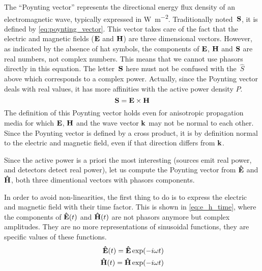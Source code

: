 The ``Poynting vector'' represents the directional energy flux density of an electromagnetic wave, typically expressed in \si{\watt\per\meter\squared}.
Traditionally noted~$\mathbf{S}$, it is defined by \cref{eq:poynting_vector}.
This vector takes care of the fact that the electric and magnetic fields ($\mathbf{E}$ and $\mathbf{H}$) are three dimensional vectors.
However, as indicated by the absence of hat symbols, the components of $\mathbf{E}$, $\mathbf{H}$ and $\mathbf{S}$ are real numbers, not complex numbers.
This means that we cannot use phasors directly in this equation.
The letter~$\mathbf{S}$ here must not be confused with the~$\hat{S}$ above which corresponds to a complex power.
Actually, since the Poynting vector deals with real values, it has more affinities with the active power density $P$.
\begin{equation}
    \mathbf{S} = \mathbf{E} \times \mathbf{H} \label{eq:poynting_vector}
\end{equation}
The definition of this Poynting vector holds even for anisotropic propagation media for which $\mathbf{E}$, $\mathbf{H}$ and the wave vector $\mathbf{k}$ may not be normal to each other.
Since the Poynting vector is defined by a cross product, it is by definition normal to the electric and magnetic field, even if that direction differs from $\mathbf{k}$.

Since the active power is a priori the most interesting (sources emit real power, and detectors detect real power), let us compute the Poynting vector from $\mathbf{\hat{E}}$ and $\mathbf{\hat{H}}$, both three dimentional vectors with phasors components.

In order to avoid non-linearities, the first thing to do is to express the electric and magnetic field with their time factor.
This is shown in \cref{eq:e_h_time}, where the components of $\mathbf{\hat{E}}(t)$ and $\mathbf{\hat{H}}(t)$ are not phasors anymore but complex amplitudes.
They are no more representations of sinusoidal functions, they are specific values of these functions.
\begin{subequations}
    \begin{align}
        \mathbf{\hat{E}}(t) = \mathbf{\hat{E}} \exp(-i \omega t) \\
        \mathbf{\hat{H}}(t) = \mathbf{\hat{H}} \exp(-i \omega t)
    \end{align}
    \label{eq:e_h_time}
\end{subequations}

